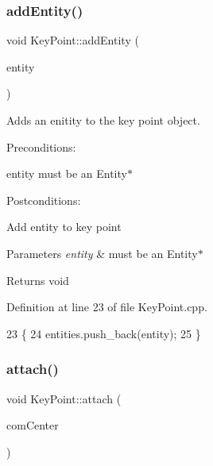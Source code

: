 \subsubsection{\texorpdfstring{add\+Entity()}{addEntity()}}
{\footnotesize\ttfamily void Key\+Point\+::add\+Entity (\begin{DoxyParamCaption}\item[{\hyperlink{classEntity}{Entity} $\ast$}]{entity }\end{DoxyParamCaption})}



Adds an enitity to the key point object. 

Preconditions\+:
\begin{DoxyItemize}
\item entity must be an Entity$\ast$
\end{DoxyItemize}

Postconditions\+:
\begin{DoxyItemize}
\item Add entity to key point
\end{DoxyItemize}


\begin{DoxyParams}{Parameters}
{\em entity} & must be an Entity$\ast$ \\
\hline
\end{DoxyParams}
\begin{DoxyReturn}{Returns}
void 
\end{DoxyReturn}


Definition at line 23 of file Key\+Point.\+cpp.


\begin{DoxyCode}
23                                        \{
24     entities.push\_back(entity);
25 \}
\end{DoxyCode}
\mbox{\label{classKeyPoint_a42df3ce6652f1817fc04324ad15a868d}} 
\subsubsection{\texorpdfstring{attach()}{attach()}}
{\footnotesize\ttfamily void Key\+Point\+::attach (\begin{DoxyParamCaption}\item[{\hyperlink{classCommandCenter}{Command\+Center} $\ast$}]{com\+Center }\end{DoxyParamCaption})}



